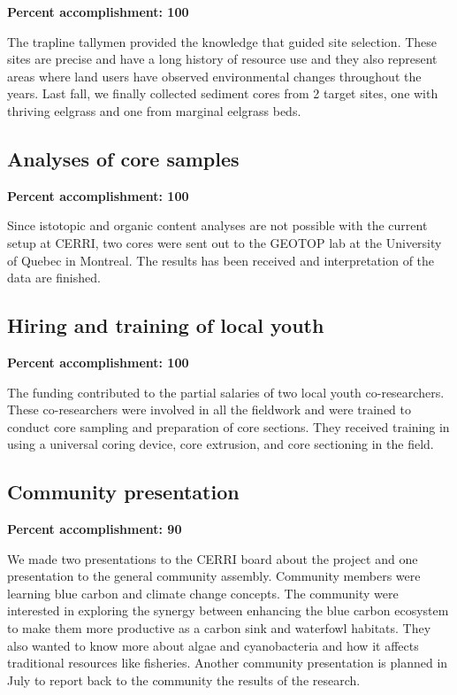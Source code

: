 \documentclass[
  12pt,
]{article}
\begin{document}
\textbf{Percent accomplishment: 100}

The trapline tallymen provided the knowledge that guided site selection.
These sites are precise and have a long history of resource use and they
also represent areas where land users have observed environmental
changes throughout the years. Last fall, we finally collected sediment
cores from 2 target sites, one with thriving eelgrass and one from
marginal eelgrass beds.

\hypertarget{analyses-of-core-samples}{%
\subsection{Analyses of core samples}\label{analyses-of-core-samples}}

\textbf{Percent accomplishment: 100 }

Since istotopic and organic content analyses are not possible with the
current setup at CERRI, two cores were sent out to the GEOTOP lab at the
University of Quebec in Montreal. The results has been received and
interpretation of the data are finished.

\hypertarget{hiring-and-training-of-local-youth}{%
\subsection{Hiring and training of local
youth}\label{hiring-and-training-of-local-youth}}

\textbf{Percent accomplishment: 100 }

The funding contributed to the partial salaries of two local youth
co-researchers. These co-researchers were involved in all the fieldwork
and were trained to conduct core sampling and preparation of core
sections. They received training in using a universal coring device,
core extrusion, and core sectioning in the field.

\hypertarget{community-presentation}{%
\subsection{Community presentation}\label{community-presentation}}

\textbf{Percent accomplishment: 90 }

We made two presentations to the CERRI board about the project and one
presentation to the general community assembly. Community members were
learning blue carbon and climate change concepts. The community were
interested in exploring the synergy between enhancing the blue carbon
ecosystem to make them more productive as a carbon sink and waterfowl
habitats. They also wanted to know more about algae and cyanobacteria
and how it affects traditional resources like fisheries. Another
community presentation is planned in July to report back to the
community the results of the research.
\end{document}
